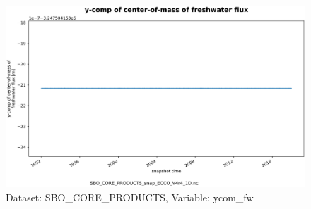 \begin{figure}[H]
\centering
\includegraphics[scale=0.55]{../images/plots/oneD_plots/SBO_Core_Products/ycom_fw.png}
\caption{Dataset: SBO\_CORE\_PRODUCTS, Variable: ycom\_fw}
\label{tab:table-SBO_CORE_PRODUCTS_ycom_fw-Plot}
\end{figure}
\newpage
\pagebreak
